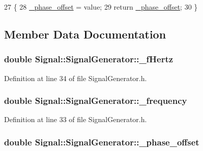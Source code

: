 \begin{DoxyCode}
27                                                                    \{
28     \hyperlink{class_signal_1_1_signal_generator_a6b4444d46747c8517171edbbf4b5588f}{\_phase\_offset} = value;
29     \textcolor{keywordflow}{return} \hyperlink{class_signal_1_1_signal_generator_a6b4444d46747c8517171edbbf4b5588f}{\_phase\_offset};
30 \}
\end{DoxyCode}


\subsection{Member Data Documentation}
\hypertarget{class_signal_1_1_signal_generator_a85a4702347352bab1c71e0a8df8437d6}{
\subsubsection[{\+\_\+f\+Hertz}]{\setlength{\rightskip}{0pt plus 5cm}double Signal\+::\+Signal\+Generator\+::\+\_\+f\+Hertz\hspace{0.3cm}{\ttfamily [protected]}}}\label{class_signal_1_1_signal_generator_a85a4702347352bab1c71e0a8df8437d6}


Definition at line 34 of file Signal\+Generator.\+h.

\hypertarget{class_signal_1_1_signal_generator_a7f107461333bce68c5dad412db96a8c2}{
\subsubsection[{\+\_\+frequency}]{\setlength{\rightskip}{0pt plus 5cm}double Signal\+::\+Signal\+Generator\+::\+\_\+frequency\hspace{0.3cm}{\ttfamily [protected]}}}\label{class_signal_1_1_signal_generator_a7f107461333bce68c5dad412db96a8c2}


Definition at line 33 of file Signal\+Generator.\+h.

\hypertarget{class_signal_1_1_signal_generator_a6b4444d46747c8517171edbbf4b5588f}{
\subsubsection[{\+\_\+phase\+\_\+offset}]{\setlength{\rightskip}{0pt plus 5cm}double Signal\+::\+Signal\+Generator\+::\+\_\+phase\+\_\+offset\hspace{0.3cm}{\ttfamily [protected]}}}\label{class_signal_1_1_signal_generator_a6b4444d46747c8517171edbbf4b5588f}


